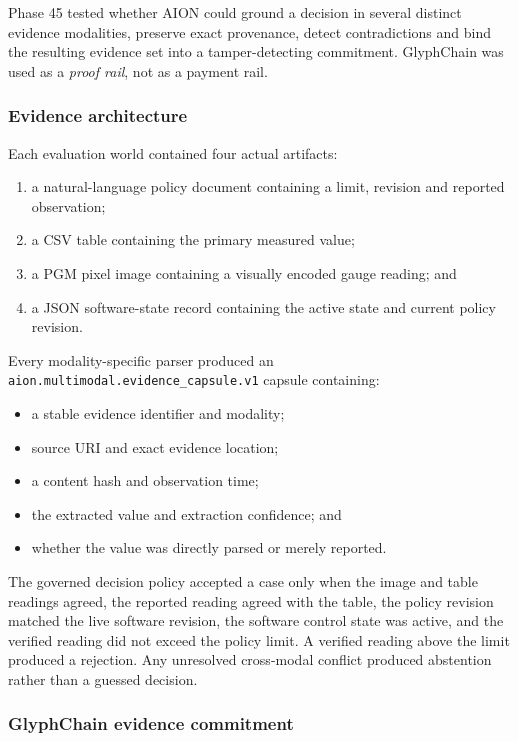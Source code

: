 Phase 45 tested whether AION could ground a decision in several distinct
evidence modalities, preserve exact provenance, detect contradictions and
bind the resulting evidence set into a tamper-detecting commitment.
GlyphChain was used as a \emph{proof rail}, not as a payment rail.

\subsubsection{Evidence architecture}

Each evaluation world contained four actual artifacts:
\begin{enumerate}
    \item a natural-language policy document containing a limit, revision and
    reported observation;
    \item a CSV table containing the primary measured value;
    \item a PGM pixel image containing a visually encoded gauge reading; and
    \item a JSON software-state record containing the active state and current
    policy revision.
\end{enumerate}

Every modality-specific parser produced an
\texttt{aion.multimodal.evidence\_capsule.v1} capsule containing:
\begin{itemize}
    \item a stable evidence identifier and modality;
    \item source URI and exact evidence location;
    \item a content hash and observation time;
    \item the extracted value and extraction confidence; and
    \item whether the value was directly parsed or merely reported.
\end{itemize}

The governed decision policy accepted a case only when the image and table
readings agreed, the reported reading agreed with the table, the policy
revision matched the live software revision, the software control state was
active, and the verified reading did not exceed the policy limit.  A verified
reading above the limit produced a rejection.  Any unresolved cross-modal
conflict produced abstention rather than a guessed decision.

\subsubsection{GlyphChain evidence commitment}

